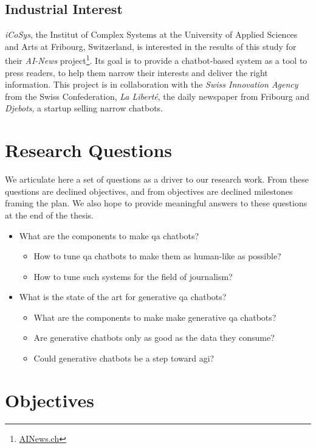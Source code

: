 \subsection*{Industrial Interest}
\textit{iCoSys}, the Institut of Complex Systems at the University of Applied Sciences and Arts at Fribourg, Switzerland, is interested in the results of this study for their \textit{AI-News} project\footnote{\url{AINews.ch}}. Its goal is to provide a chatbot-based system as a tool to press readers, to help them narrow their interests and deliver the right information. This project is in collaboration with the \textit{Swiss Innovation Agency} from the Swiss Confederation, \textit{La Liberté}, the daily newspaper from Fribourg and \textit{Djebots}, a startup selling narrow chatbots.

\section*{Research Questions}
We articulate here a set of questions as a driver to our research work. From these questions are declined objectives, and from objectives are declined milestones framing the plan. We also hope to provide meaningful answers to these questions at the end of the thesis.
\begin{itemize}[noitemsep]
    \item What are the components to make \gls{qa} chatbots?
    \begin{itemize}[noitemsep]
        \item How to tune \gls{qa} chatbots to make them as human-like as possible?
        \item How to tune such systems for the field of journalism?
    \end{itemize}
    \item What is the state of the art for generative \gls{qa} chatbots?
    \begin{itemize}[noitemsep]
    	\item What are the components to make make generative \gls{qa} chatbots?
        \item Are generative chatbots only as good as the data they consume?
        \item Could generative chatbots be a step toward \gls{agi}?
    \end{itemize}
\end{itemize}

\section*{Objectives}
